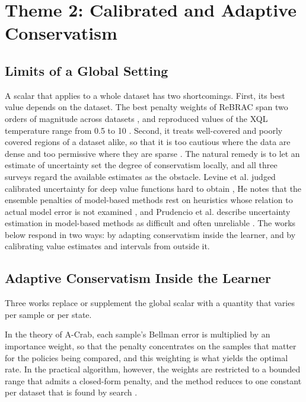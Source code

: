 \documentclass[journal]{IEEEtran}
\begin{document}
\section{Theme 2: Calibrated and Adaptive Conservatism}
\label{sec:theme2}
\subsection{Limits of a Global Setting}
A scalar that applies to a whole dataset has two shortcomings. First, its best value depends on the dataset. The best penalty weights of ReBRAC span two orders of magnitude across datasets \cite{tarasov2023rebrac}, and reproduced values of the XQL temperature range from 0.5 to 10 \cite{gao2026qql}. Second, it treats well-covered and poorly covered regions of a dataset alike, so that it is too cautious where the data are dense and too permissive where they are sparse \cite{upadhyay2026uniq}. The natural remedy is to let an estimate of uncertainty set the degree of conservatism locally, and all three surveys regard the available estimates as the obstacle. Levine et al. judged calibrated uncertainty for deep value functions hard to obtain \cite{levine2020tutorial}, He notes that the ensemble penalties of model-based methods rest on heuristics whose relation to actual model error is not examined \cite{he2023survey}, and Prudencio et al. describe uncertainty estimation in model-based methods as difficult and often unreliable \cite{prudencio2024survey}. The works below respond in two ways: by adapting conservatism inside the learner, and by calibrating value estimates and intervals from outside it.

\subsection{Adaptive Conservatism Inside the Learner}
Three works replace or supplement the global scalar with a quantity that varies per sample or per state.

In the theory of A-Crab, each sample's Bellman error is multiplied by an importance weight, so that the penalty concentrates on the samples that matter for the policies being compared, and this weighting is what yields the optimal rate. In the practical algorithm, however, the weights are restricted to a bounded range that admits a closed-form penalty, and the method reduces to one constant per dataset that is found by search \cite{zhu2023acrab}.
\end{document}
